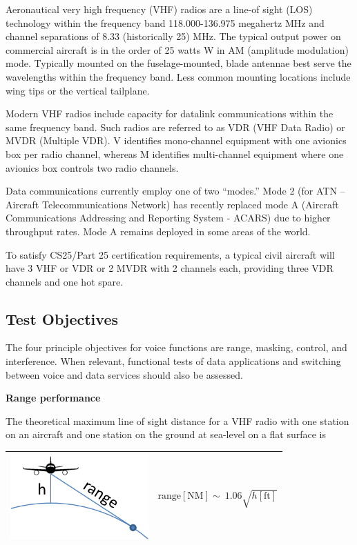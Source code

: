\documentclass[
]{book}
\begin{document}
Aeronautical very high frequency (VHF) radios are a line-of sight (LOS)
technology within the frequency band 118.000-136.975 megahertz MHz
and channel separations of 8.33 (historically 25) MHz. The
typical output power on commercial aircraft is in the order of 25 watts W
in AM (amplitude modulation) mode. Typically mounted on the fuselage-mounted,
blade antennae best serve the wavelengths within the frequency band. Less common
mounting locations include wing tips or the vertical tailplane.

Modern VHF radios include capacity for datalink communications within the same
frequency band. Such radios are referred to as VDR (VHF Data Radio) or MVDR
(Multiple VDR). V identifies mono-channel equipment with one avionics box per
radio channel, whereas M identifies multi-channel equipment where one avionics
box controls two radio channels.

Data communications currently employ one of two ``modes.'' Mode 2 (for ATN --
Aircraft Telecommunications Network) has recently replaced mode A (Aircraft
Communications Addressing and Reporting System - ACARS) due to higher throughput
rates. Mode A remains deployed in some areas of the world.

To satisfy CS25/Part 25 certification requirements, a typical civil aircraft
will have 3 VHF or VDR or 2 MVDR with 2 channels each, providing
three VDR channels and one hot spare.

\hypertarget{test-objectives}{%
\subsection{Test Objectives}\label{test-objectives}}

The four principle objectives for voice functions are range, masking, control,
and interference. When relevant, functional tests of data applications and
switching between voice and data services should also be assessed.

\textbf{Range performance}

The theoretical maximum line of sight distance for a VHF radio with one station
on an aircraft and one station on the ground at sea-level on a flat surface is

\begin{longtable}[]{@{}rl@{}}
\toprule
\endhead
\begin{minipage}[t]{0.47\columnwidth}\raggedleft
\includegraphics[width=2.07847in,height=1.28681in]{media/20/image1.png}\strut
\end{minipage} & \begin{minipage}[t]{0.47\columnwidth}\raggedright
\[\text{range} \left[ \text{NM} \right] \sim\ 1.06\sqrt{h \left[ \text{ft} \right]}\]\strut
\end{minipage}\tabularnewline
\bottomrule
\end{longtable}
\end{document}
